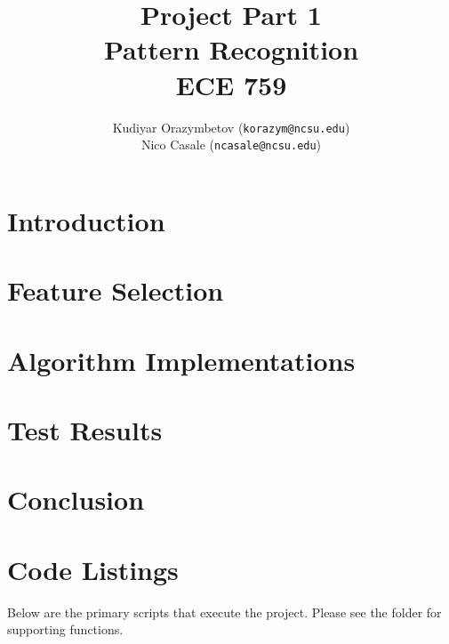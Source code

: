 \documentclass[]{ncmathy}
\newcommand{\theassignment}{Project Part 1}
\newcommand{\thecourse}{Pattern Recognition\\ECE 759}
\begin{document}
\title{\theassignment\\\thecourse}
\author{Kudiyar Orazymbetov (\texttt{korazym@ncsu.edu})\\Nico Casale (\texttt{ncasale@ncsu.edu})}

\makeFancyTitle

\tableofcontents
\pagebreak
\makeatletter
\let\@starttoc\@multitoc@starttoc
\listoffigures
\listoftables
\lstlistoflistings
\makeatother

\pagebreak

\section{Introduction} 
	

\section{Feature Selection}
	

\section{Algorithm Implementations}
	
        
	

\section{Test Results}
	

\section{Conclusion}
	




\section{Code Listings}

Below are the primary scripts that execute the project. Please see the
 folder for supporting functions.




\end{document}
